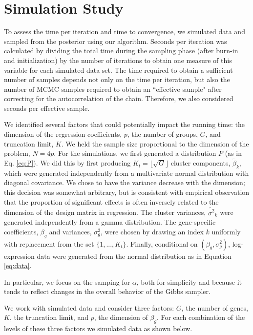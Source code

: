 {\section{Simulation Study}
\label{sec:timing}
To assess the time per iteration and time to convergence, we simulated data and sampled from the posterior using our algorithm. Seconds per iteration was calculated by dividing the total time during the sampling phase (after burn-in and initialization) by the number of iterations to obtain one measure of this variable for each simulated data set. The time required to obtain a sufficient number of samples depends not only on the time per iteration, but also the number of MCMC samples required to obtain an ``effective sample" after correcting for the autocorrelation of the chain. Therefore, we also considered seconds per effective sample.

We identified several factors that could potentially impact the running time: the dimension of the regression coefficients, $p$, the number of groups, $G$, and truncation limit, $K$. We held the sample size proportional to the dimension of the problem, $N=4p$. For the simulations, we first generated a distribution $P$ (as in Eq. \ref{eq:P}). We did this by first producing $K_t=\lfloor \sqrt{G}\rfloor$ cluster components, $\tilde{\beta}_k$, which were generated independently from a multivariate normal distribution with diagonal covariance. We chose to have the variance decrease with the dimension; this decision was somewhat arbitrary, but is consistent with empirical observation that the proportion of significant effects is often inversely related to the dimension of the design matrix in regression. The cluster variances, $\tilde{\sigma^2}_k$ were generated independently from a gamma distribution. The gene-specific coefficients, $\beta_g$ and variances, $\sigma^2_g$, were chosen by drawing an index $k$ uniformly with replacement from the set $\{1,...,K_t\}$. Finally, conditional on $(\beta_g,\sigma^2_g)$, log-expression data were generated from the normal distribution as in Equation \ref{eq:data}.

In particular, we focus on the samping for $\alpha$, both for simplicity and because it tends to reflect changes in the overall behavior of the Gibbs sampler.

We work with simulated data and consider three factors: $G$, the number of genes, $K$, the truncation limit, and $p$, the dimension of $\beta_g$. For each combination of the levels of these three factors we simulated data as shown below.

}
